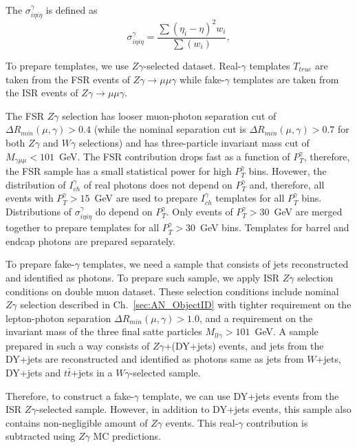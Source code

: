 The $\sigma_{i\eta i\eta}^{\gamma}$ is defined as
\begin{equation}
  \sigma_{i\eta i\eta}^{\gamma} = \frac{\sum{(\eta_i-\eta)^2 w_i}}{\sum(w_i)},
\end{equation}

To prepare templates, we use $Z\gamma$-selected dataset. Real-$\gamma$ templates $T_{true}$ are taken from the FSR events of $Z\gamma\rightarrow\mu\mu\gamma$ while fake-$\gamma$ templates are taken from the ISR events of $Z\gamma\rightarrow\mu\mu\gamma$.

The FSR $Z\gamma$ selection has looser muon-photon separation cut of $\Delta R_{min}(\mu,\gamma)>0.4$ (while the nominal separation cut is $\Delta R_{min}(\mu,\gamma)>0.7$ for both $Z\gamma$ and $W\gamma$ selections) and has three-particle invariant mass cut of $M_{\gamma\mu\mu}<101$~GeV. The FSR contribution drops fast as a function of $P_{T}^{\gamma}$, therefore, the FSR sample has a small statistical power for high $P_{T}^{\gamma}$ bins. Hovewer, the distribution of $I_{ch}^{\gamma}$ of real photons does not depend on $P_{T}^{\gamma}$ and, therefore, all events with $P_{T}^{\gamma}>15$~GeV are used to prepare $I_{ch}^{\gamma}$ templates for all $P_T^{\gamma}$ bins. Distributions of $\sigma_{i\eta i\eta}^{\gamma}$ do depend on $P_T^{\gamma}$. Only events of $P_T^{\gamma}>30$~GeV are merged together to prepare templates for all $P_T^{\gamma}>30$~GeV bins. Templates for barrel and endcap photons are prepared separately.

To prepare fake-$\gamma$ templates, we need a sample that consists of jets reconstructed and identified as photons. To prepare such sample, we apply ISR $Z\gamma$ selection conditions on double muon dataset. These selection conditions include nominal $Z\gamma$ selection described in Ch.~\ref{sec:AN_ObjectID} with tighter requirement on the lepton-photon separation $\Delta{R_{min}}(\mu,\gamma)>1.0$, and a requirement on the invariant mass of the three final satte particles $M_{ll\gamma}>101$~GeV. A sample prepared in such a way consists of $Z\gamma$+(DY+jets) events, and jets from the DY+jets are reconstructed and identified as photons same as jets from $W$+jets, DY+jets and $t\bar{t}$+jets in a $W\gamma$-selected sample. 

Therefore, to construct a fake-$\gamma$ template, we can use DY+jets events from the ISR $Z\gamma$-selected sample. However, in addition to DY+jets events, this sample also contains non-negligible amount of $Z\gamma$ events. This real-$\gamma$ contribution is subtracted using $Z\gamma$ MC predictions.

